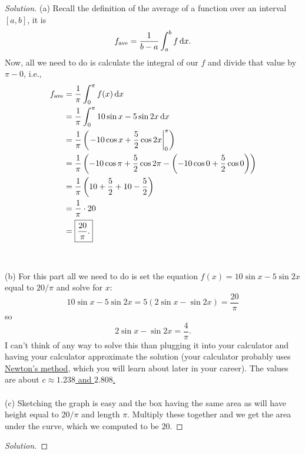 \begin{proof}[Solution]
(a) Recall the definition of the average of a function over an interval
$[a,b]$, it is
\begin{equation}
  \label{eq:average}
f_{\text{ave}}=\frac{1}{b-a}\int_a^b f\,\mathrm{d} x.
\end{equation}
Now, all we need to do is calculate the integral of our $f$ and divide that
value by $\pi-0$, i.e.,
\begingroup
\allowdisplaybreaks
\begin{align*}
f_{\text{ave}}&=\frac{1}{\pi}\int_0^\pi f(x)\,\mathrm{d} x\\
&=\frac{1}{\pi}\int_0^\pi 10\sin x-5\sin 2x\,\mathrm{d} x\\
&=\frac{1}{\pi}\left(\left.-10\cos x+\frac{5}{2}\cos
  2x\right|_0^\pi\right)\\
&=\frac{1}{\pi}\left(-10\cos\pi+\frac{5}{2}\cos 2\pi-\left(-10\cos
  0+\frac{5}{2}\cos 0\right)\right)\\
&=\frac{1}{\pi}\left(10+\frac{5}{2}+10-\frac{5}{2}\right)\\
&=\frac{1}{\pi}\cdot 20\\
&=\boxed{\frac{20}{\pi}.}
\end{align*}
\endgroup
\\\\
(b) For this part all we need to do is set the equation $f(x)=10\sin
x-5\sin 2x$ equal to $20/\pi$ and solve for $x$:
\[
10\sin x-5\sin 2x=5(2\sin x-\sin 2x)=\frac{20}{\pi}
\]
so
\[
  2\sin x-\sin 2x=\frac{4}{\pi}.
\]
I can't think of any way to solve this than plugging it into your
calculator and having your calculator approximate the solution (your
calculator probably uses
\href{https://en.wikipedia.org/wiki/Newton's_method}{Newton's method},
which you will learn about later in your career). The values are about
\ul{$c\approx 1.238$ and $2.808$.}
\\\\
(c) Sketching the graph is easy and the box having the same area as will
have height equal to $20/\pi$ and length $\pi$. Multiply these together and
we get the area under the curve, which we computed to be $20$.
\end{proof}
\begin{problem}[WebAssign, HW8, 8]
\end{problem}
\begin{proof}[Solution]
\end{proof}

